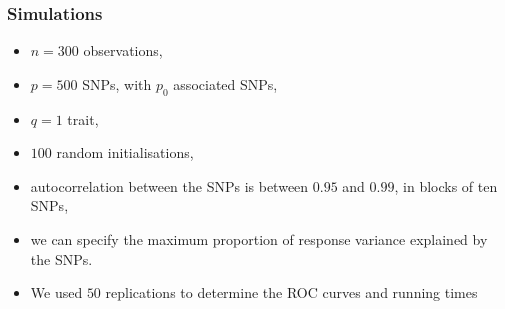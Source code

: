 \documentclass{beamer}
\newcommand*\mean[1]{\bar{#1}}
\begin{document}

\begin{frame}
\frametitle{Simulations}
\begin{itemize}
\item $n = 300$ observations,
\item $p = 500$ SNPs, with $p_0$ associated SNPs,
\item $q = 1$ trait, %
\item $100$ random initialisations,
\item autocorrelation between the SNPs is between $0.95$ and $0.99$, in blocks of ten SNPs,
\item we can specify the maximum proportion of response variance explained by the SNPs.
\item We used $50$ replications to determine the ROC curves and running times
\end{itemize}
\end{frame}

\end{document}
